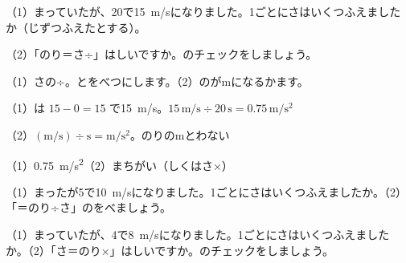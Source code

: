 \begin{reidai}[\R{単位}{たん|い}を\R{計算}{けい|さん}する]
（1）まっていたが、20で\qty{15}{m/s}になりました。1ごとにさはいくつふえましたか（じずつふえたとする）。\par
（2）「のり＝さ÷」はしいですか。のチェックをしましょう。\par
\kangaekata（1）さの÷。とをべつにします。（2）のがmになるかます。\par
\shiki（1）は $15-0=15$ で\qty{15}{m/s}。$15\,\mathrm{m/s}\div20\,\mathrm{s}=0.75\,\mathrm{m/s^2}$\par
\hspace*{2.6\zw}（2）$(\mathrm{m/s})\div\mathrm{s}=\mathrm{m/s^2}$。のりのmとわない\par
\kotae（1）\qty{0.75}{m/s^2}\quad（2）まちがい（しくはさ×）
\end{reidai}

\begin{jibun}
（1）まったが5で\qty{10}{m/s}になりました。1ごとにさはいくつふえましたか。（2）「＝のり÷さ」のをべましょう。
\end{jibun}

\begin{jibun}
（1）まっていたが、4で\qty{8}{m/s}になりました。1ごとにさはいくつふえましたか。（2）「さ＝のり×」はしいですか。のチェックをしましょう。
\end{jibun}

